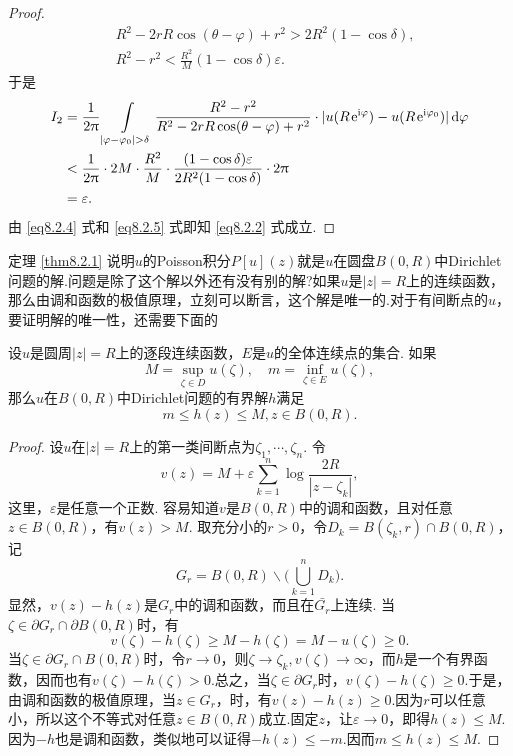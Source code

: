 \begin{proof}
  \begin{align*}
    & R^2 - 2rR \cos(\theta-\varphi) + r^2 > 2R^2(1-\cos\delta),\\
    & R^2 - r^2 < \frac{R^2}M(1-\cos\delta)\varepsilon.
  \end{align*}
  于是
  \begin{equation}\label{eq8.2.5}
    \begin{aligned}
      I_2 & = \frac1{2\uppi}\int\limits_{|\varphi-\varphi_0| > \delta}\frac{R^2-r^2}{R^2-2rR
              \cos(\theta-\varphi)+r^2}\cdot|u(R\operatorname{\!\!\;\mathrm e}^{\mathrm i\varphi})-u(R\operatorname{\!\!\;\mathrm e}^{\mathrm i\varphi_0})|\mathop{}\!\mathrm{d} \varphi\\
          & < \frac1{2\uppi}\cdot2M\cdot\frac{R^2}M\cdot\frac{(1-\cos\delta)\varepsilon}
              {2R^2(1-\cos\delta)}\cdot2\uppi\\
          & = \varepsilon.
    \end{aligned}
  \end{equation}
  由 \eqref{eq8.2.4} 式和 \eqref{eq8.2.5} 式即知 \eqref{eq8.2.2} 式成立.
\end{proof}

定理 \ref{thm8.2.1} 说明$u$的Poisson积分$P[u](z)$就是$u$在圆盘$B(0,R)$中Dirichlet问题的解.问题是除了这个解以外还有没有别的解?如果$u$是$|z|=R$上的连续函数，那么由调和函数的极值原理，立刻可以断言，这个解是唯一的.对于有间断点的$u$，要证明解的唯一性，还需要下面的
\begin{prop}\label{prop8.2.2}
  设$u$是圆周$|z|=R$上的逐段连续函数，$E$是$u$的全体连续点的集合. 如果
  \[
    M = \sup_{\zeta\in D}u(\zeta),\quad m = \inf_{\zeta\in E}u(\zeta),
  \]
  那么$u$在$B(0,R)$中Dirichlet问题的有界解$h$满足
  \[
    m \le h(z)\le M,z\in B(0,R).
  \]
\end{prop}
\begin{proof}
  设$u$在$|z|=R$上的第一类间断点为$\zeta_1,\cdots,\zeta_n$. 令
  \[
    v(z) = M + \varepsilon\sum_{k=1}^n\log\frac{2R}{|z-\zeta_k|},
  \]
  这里，$\varepsilon$是任意一个正数. 容易知道$v$是$B(0,R)$中的调和函数，且对任意$z\in B(0,R)$，有$v(z)>M$. 取充分小的$r>0$，令$D_k=B(\zeta_k,r)\cap B(0,R)$，记
  \[
    G_r = B(0,R)\backslash\big(\bigcup_{k=1}^nD_k\big).
  \]
  显然，$v(z)-h(z)$是$G_r$中的调和函数，而且在$\bar{G_r}$上连续. 当$\zeta\in\partial G_r\cap\partial B(0,R)$时，有
  \[
    v(\zeta) - h(\zeta)\ge M - h(\zeta) = M-u(\zeta)\ge0.
  \]
  当$\zeta\in\partial G_r\cap B(0,R)$时，令$r\to0$，则$\zeta\to \zeta_k,v(\zeta)\to\infty$，而$h$是一个有界函数，因而也有$v(\zeta)-h(\zeta)>0$.总之，当$\zeta\in\partial G_r$时，$v(\zeta)-h(\zeta)\ge0$.于是，由调和函数的极值原理，当$z\in G_r$，时，有$v(z)-h(z)\ge0$.因为$r$可以任意小，所以这个不等式对任意$z\in B(0,R)$成立.固定$z$，让$\varepsilon\to0$，即得$h(z)\le M$.因为$-h$也是调和函数，类似地可以证得$-h(z)\le -m$.因而$m\le h(z)\le M$.
\end{proof}

